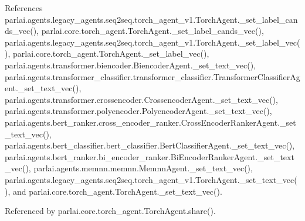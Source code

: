 References parlai.\+agents.\+legacy\+\_\+agents.\+seq2seq.\+torch\+\_\+agent\+\_\+v1.\+Torch\+Agent.\+\_\+set\+\_\+label\+\_\+cands\+\_\+vec(), parlai.\+core.\+torch\+\_\+agent.\+Torch\+Agent.\+\_\+set\+\_\+label\+\_\+cands\+\_\+vec(), parlai.\+agents.\+legacy\+\_\+agents.\+seq2seq.\+torch\+\_\+agent\+\_\+v1.\+Torch\+Agent.\+\_\+set\+\_\+label\+\_\+vec(), parlai.\+core.\+torch\+\_\+agent.\+Torch\+Agent.\+\_\+set\+\_\+label\+\_\+vec(), parlai.\+agents.\+transformer.\+biencoder.\+Biencoder\+Agent.\+\_\+set\+\_\+text\+\_\+vec(), parlai.\+agents.\+transformer\+\_\+classifier.\+transformer\+\_\+classifier.\+Transformer\+Classifier\+Agent.\+\_\+set\+\_\+text\+\_\+vec(), parlai.\+agents.\+transformer.\+crossencoder.\+Crossencoder\+Agent.\+\_\+set\+\_\+text\+\_\+vec(), parlai.\+agents.\+transformer.\+polyencoder.\+Polyencoder\+Agent.\+\_\+set\+\_\+text\+\_\+vec(), parlai.\+agents.\+bert\+\_\+ranker.\+cross\+\_\+encoder\+\_\+ranker.\+Cross\+Encoder\+Ranker\+Agent.\+\_\+set\+\_\+text\+\_\+vec(), parlai.\+agents.\+bert\+\_\+classifier.\+bert\+\_\+classifier.\+Bert\+Classifier\+Agent.\+\_\+set\+\_\+text\+\_\+vec(), parlai.\+agents.\+bert\+\_\+ranker.\+bi\+\_\+encoder\+\_\+ranker.\+Bi\+Encoder\+Ranker\+Agent.\+\_\+set\+\_\+text\+\_\+vec(), parlai.\+agents.\+memnn.\+memnn.\+Memnn\+Agent.\+\_\+set\+\_\+text\+\_\+vec(), parlai.\+agents.\+legacy\+\_\+agents.\+seq2seq.\+torch\+\_\+agent\+\_\+v1.\+Torch\+Agent.\+\_\+set\+\_\+text\+\_\+vec(), and parlai.\+core.\+torch\+\_\+agent.\+Torch\+Agent.\+\_\+set\+\_\+text\+\_\+vec().



Referenced by parlai.\+core.\+torch\+\_\+agent.\+Torch\+Agent.\+share().

